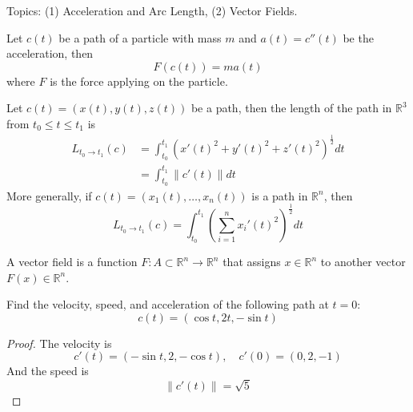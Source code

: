 \documentclass[openany]{book}
\newcommand{\R}{\mathbb{R}}
\begin{document}
\renewcommand\thesection{\arabic{section}}

\noindent
Topics: (1) Acceleration and Arc Length, (2) Vector Fields.

\begin{prop}
    Let $c(t)$ be a path of a particle with mass $m$ and $a(t)=c''(t)$ be the acceleration, then 
    \begin{equation*}
        F(c(t))=ma(t)
    \end{equation*}
    where $F$ is the force applying on the particle.
\end{prop}


\begin{defn}
    Let $c(t)=(x(t), y(t), z(t))$ be a path, then the length of the path in $\R^3$ from $t_0\leq t\leq t_1$ is 
    \begin{align*}
        L_{t_0\to t_1}(c)&=\int_{t_0}^{t_1}\left(x'(t)^2+y'(t)^2+z'(t)^2\right)^\frac{1}{2}dt\\
        &=\int_{t_0}^{t_1}\|c'(t)\|dt
    \end{align*}
    More generally, if $c(t)=(x_1(t), \dots, x_n(t))$ is a path in $\R^n$, then 
    \begin{equation*}
        L_{t_0\to t_1}(c)=\int_{t_0}^{t_1}\left(\sum_{i=1}^nx_i'(t)^2\right)^\frac{1}{2}dt
    \end{equation*}
\end{defn}


\begin{defn}
    A vector field is a function $F:A\subset\R^n\to\R^n$ that assigns $x\in\R^n$ to another vector $F(x)\in\R^n$.
\end{defn}







\begin{prob}
    Find the velocity, speed, and acceleration of the following path at $t=0$:
    \begin{equation*}
        c(t)=(\cos t, 2t, -\sin t)
    \end{equation*}
\end{prob}
\begin{proof}
    The velocity is 
    \begin{equation*}
        c'(t)=(-\sin t, 2, -\cos t), \quad c'(0)=(0,2,-1)
    \end{equation*}
    And the speed is 
    \begin{equation*}
        \|c'(t)\|=\sqrt{5}
    \end{equation*}
\end{proof}
\end{document}
